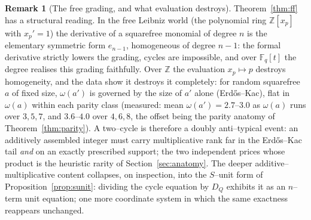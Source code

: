 \documentclass[11pt]{article}
\theoremstyle{definition}
\newtheorem{remark}[theorem]{Remark}
\begin{document}
\begin{remark}[The free grading, and what evaluation destroys]\label{rem:grading}
Theorem~\ref{thm:ff} has a structural reading. In the free Leibniz world (the polynomial ring
$\mathbb{Z}[x_p]$ with $x_p'=1$) the derivative of a squarefree monomial of degree $n$ is the
elementary symmetric form $e_{n-1}$, homogeneous of degree $n-1$: the formal derivative strictly lowers
the grading, cycles are impossible, and over $\mathbb{F}_q[t]$ the degree realises this grading
faithfully. Over $\mathbb{Z}$ the evaluation $x_p\mapsto p$ destroys homogeneity, and the data show it
destroys it completely: for random squarefree $a$ of fixed size, $\omega(a')$ is governed by the size of
$a'$ alone (Erd\H{o}s--Kac), flat in $\omega(a)$ within each parity class (measured: mean
$\omega(a')=2.7$--$3.0$ as $\omega(a)$ runs over $3,5,7$, and $3.6$--$4.0$ over $4,6,8$, the offset being
the parity anatomy of Theorem~\ref{thm:parity}). A two--cycle is therefore a doubly anti--typical event:
an additively assembled integer must carry multiplicative rank far in the Erd\H{o}s--Kac tail \emph{and}
on an exactly prescribed support; the two independent prices whose product is the heuristic rarity of
Section~\ref{sec:anatomy}. The deeper additive--multiplicative content collapses, on inspection, into
the $S$--unit form of Proposition~\ref{prop:sunit}: dividing the cycle equation by $D_Q$ exhibits it as
an $n$--term unit equation; one more coordinate system in which the same exactness reappears
unchanged.
\end{remark}
\end{document}
